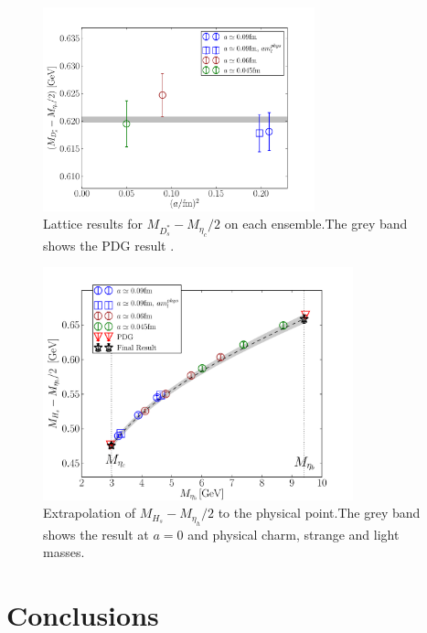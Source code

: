 \begin{figure}[htb!]
  \begin{center}
  \includegraphics[width=0.70\textwidth]{images/BsDsstar/Dsmasses.pdf}
  \caption{Lattice results for $M_{D_s^*}-M_{\eta_c}/2$ on each ensemble.The grey band shows the PDG result \cite{PhysRevD.98.030001}. \label{fig:Dsmasses}}
  \end{center}
\end{figure}

\begin{figure}[htb!]
  \begin{center}
  \includegraphics[width=0.80\textwidth]{images/BsDsstar/MHs-Metah.pdf}
  \caption{Extrapolation of $M_{H_s}-M_{\eta_h}/2$ to the physical point.The grey band shows the result at $a=0$ and physical charm, strange and light masses. \label{fig:MHsmasses}}
  \end{center}
\end{figure}

\section{Conclusions}
\label{sec:conclusions}


